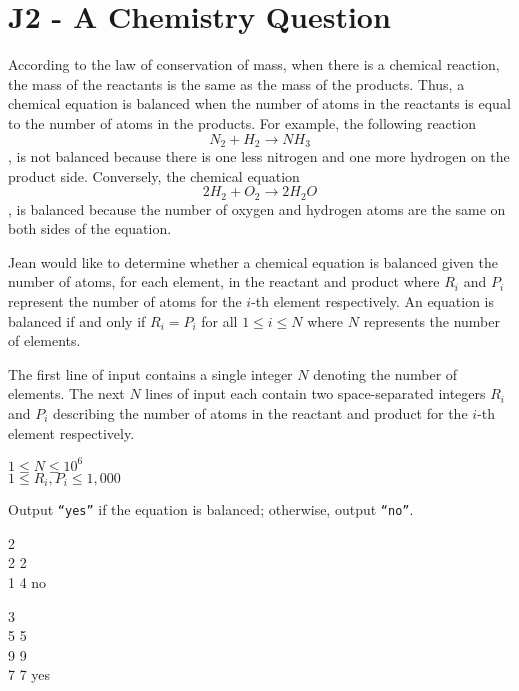 \section*{J2 - A Chemistry Question}
According to the law of conservation of mass, when there is a chemical reaction, the mass of the reactants is the same as the mass of the products. Thus, a chemical equation is balanced when the number of atoms in the reactants is equal to the number of atoms in the products. For example, the following reaction $$N_2 + H_2 \rightarrow NH_3$$,
is not balanced because there is one less nitrogen and one more hydrogen on the product side. Conversely, the chemical equation $$2H_2+O_2 \rightarrow 2H_2O$$, is balanced because the number of oxygen and hydrogen atoms are the same on both sides of the equation. 

Jean would like to determine whether a chemical equation is balanced given the number of atoms, for each element, in the reactant and product where $R_i$ and $P_i$ represent the number of atoms for the $i$-th element respectively. An equation is balanced if and only if $R_i = P_i$ for all $1 \leq i \leq N$ where $N$ represents the number of elements.

The first line of input contains a single integer $N$ denoting the number of elements. The next $N$ lines of input each contain two space-separated integers $R_i$ and $P_i$ describing the number of atoms in the reactant and product for the $i$-th element respectively.

\constraints
$1 \leq N \leq 10^6$ \\
$1 \leq R_i, P_i \leq 1,000$

\outputformat
Output \texttt{``yes''} if the equation is balanced; otherwise, output \texttt{``no''}.

\addsample
{
    2 \\
    2 2 \\
    1 4
}
{
    no
}

\addsample
{
    3 \\
    5 5 \\
    9 9 \\
    7 7
}
{
    yes
}